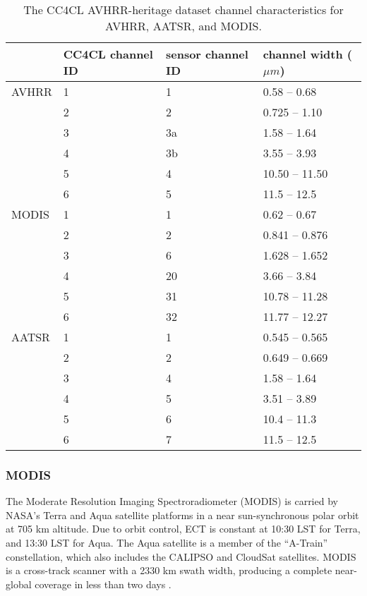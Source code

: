 \begin{table}[h]
  \caption{The CC4CL AVHRR-heritage dataset channel characteristics for AVHRR, AATSR, and MODIS.}
  \begin{tabular}{l|p{1.5cm}p{1.5cm}p{1.8cm}}
    \hline
    & CC4CL channel ID & sensor channel ID & channel width ($\mu m$) \\
    \hline
    AVHRR & 1 & 1 & 0.58 -- 0.68 \\
          & 2 & 2 & 0.725 -- 1.10 \\
          & 3 & 3a & 1.58 -- 1.64 \\
          & 4 & 3b & 3.55 -- 3.93 \\
          & 5 & 4 & 10.50 -- 11.50 \\
          & 6 & 5 & 11.5 -- 12.5 \\
    \hline
    MODIS & 1 & 1 & 0.62 -- 0.67 \\
          & 2 & 2 & 0.841 -- 0.876 \\
          & 3 & 6 & 1.628 -- 1.652 \\
          & 4 & 20 & 3.66 -- 3.84 \\
          & 5 & 31 & 10.78 -- 11.28 \\
          & 6 & 32 & 11.77 -- 12.27 \\
    \hline
    AATSR & 1 & 1 & 0.545 -- 0.565 \\
          & 2 & 2 & 0.649 -- 0.669 \\
          & 3 & 4 & 1.58 -- 1.64 \\
          & 4 & 5 & 3.51 -- 3.89 \\
          & 5 & 6 & 10.4 -- 11.3 \\
          & 6 & 7 & 11.5 -- 12.5 \\
    \hline
  \end{tabular}
  \label{tab:channels}
\end{table}


\subsubsection{MODIS}

The Moderate Resolution Imaging Spectroradiometer (MODIS) is carried by NASA's Terra and Aqua satellite platforms in a near sun-synchronous polar orbit at 705 km altitude. Due to orbit control, ECT is constant at 10:30 LST for Terra, and 13:30 LST for Aqua. The Aqua satellite is a member of the ``A-Train'' constellation, which also includes the CALIPSO and CloudSat satellites. MODIS is a cross-track scanner with a 2330 km swath width, producing a complete near-global coverage in less than two days \citep{Xiong09}.

